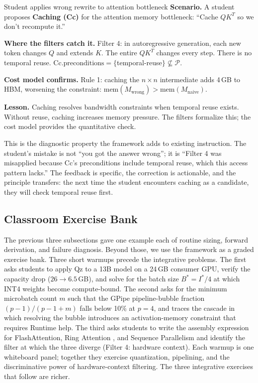 \documentclass[10pt,twocolumn]{article}
\newcommand{\AttnTotalGB}{4}          %
\begin{document}
\begin{errorcase}{Student applies wrong rewrite to attention bottleneck}
\textbf{Scenario.} A student proposes \textbf{Caching (Cc)} for the attention memory bottleneck: ``Cache $QK^T$ so we don't recompute it.''

\textbf{Where the filters catch it.} Filter 4: in autoregressive generation, each new token changes $Q$ and extends $K$. The entire $QK^T$ changes every step. There is no temporal reuse. $\text{Cc}.\text{preconditions} = \{$temporal-reuse$\} \not\subseteq \mathcal{P}$.

\textbf{Cost model confirms.} Rule 1: caching the $n \times n$ intermediate adds \AttnTotalGB{}\,GB to HBM, worsening the constraint: $\text{mem}(M_{\text{wrong}}) > \text{mem}(M_{\text{naive}})$.

\textbf{Lesson.} Caching resolves bandwidth constraints when temporal reuse exists. Without reuse, caching increases memory pressure. The filters formalize this; the cost model provides the quantitative check.
\end{errorcase}

This is the diagnostic property the framework adds to existing instruction. The student's mistake is not ``you got the answer wrong''; it is ``Filter 4 was misapplied because Cc's preconditions include temporal reuse, which this access pattern lacks.'' The feedback is specific, the correction is actionable, and the principle transfers: the next time the student encounters caching as a candidate, they will check temporal reuse first.

\subsection{Classroom Exercise Bank}
\label{sec:exercises}

The previous three subsections gave one example each of routine sizing, forward derivation, and failure diagnosis. Beyond those, we use the framework as a graded exercise bank. Three short warmups precede the integrative problems. The first asks students to apply Qz to a 13B model on a 24\,GB consumer GPU, verify the capacity drop ($26 \to 6.5$\,GB), and solve for the batch size $B^{*} = I^{*}/4$ at which INT4 weights become compute-bound. The second asks for the minimum microbatch count $m$ such that the GPipe pipeline-bubble fraction $(p-1)/(p-1+m)$ falls below 10\% at $p = 4$, and traces the cascade in which resolving the bubble introduces an activation-memory constraint that requires Runtime help. The third asks students to write the assembly expression for FlashAttention, Ring Attention \citep{liu2023ring}, and Sequence Parallelism \citep{korthikanti2023reducing} and identify the filter at which the three diverge (Filter 4: hardware context). Each warmup is one whiteboard panel; together they exercise quantization, pipelining, and the discriminative power of hardware-context filtering. The three integrative exercises that follow are richer.
\end{document}
